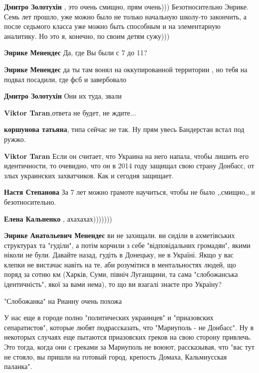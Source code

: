 \begin{itemize}
\begin{itemize}
\textbf{Дмитро Золотухін} , это очень смищно, прям очень))) Безотносительно Энрике. Семь лет прошло, уже можно было не только начальную школу-то закончить, а после седьмого класса уже можно быть способным и на элементарную аналитику. Но это я, конечно, по своим детям сужу)))

\textbf{Энрике Менендес} Да, где Вы были с 7 до 11?

\textbf{Энрике Менендес} да ты там вонял на оккупированной территории , но тебя на подвал посадили, где фсб и завербовало

\textbf{Дмитро Золотухін} Они их туда, звали

\textbf{Viktor Taran},ответа не будет, не ждите...

\textbf{коршунова татьяна}, типа сейчас не так. Ну прям увесь Бандерстан встал под ружжо.

\textbf{Viktor Taran} Если он считает, что Украина на него напала, чтобы лишить его идентичности, то очевидно, что он в 2014 году защищал свою страну Донбасс, от злых украинских захватчиков. Как и сегодня защищает.

\textbf{Настя Степанова} За 7 лет можно грамоте научиться, чтобы не было ,,смищно,, и безотносительно.

\textbf{Елена Кальненко} , ахахахах)))))))

\textbf{Энрике Анатольевич Менендес} ви не захищали. ви сиділи в ахметівських структурах та "гуділи", а потім корчили з себе "відповідальних громадян", якими ніколи не були. Давайте назад, гудіть в Донецьку, не в Україні.
Якщо у вас клепки не вистачає навіть на те, аби розумітися в ментальностях людей, що поряд за сотню км (Харків, Суми, північ Луганщини, та сама "слобожанська ідентичність", якої за вами нема), то що ви взагалі знаєте про Україну?

\end{itemize} %

"Слобожанка" на Рианну очень похожа


У нас еще в городе полно "политических украинцев" и "приазовских сепаратистов",
которые любят подрассказать, что "Мариуполь - не Донбасс". Ну в некоторых
случаях еще пытаются приазовских греков на свою сторону привлечь. Это тогда,
когда они с греками за Мариуполь не воюют, рассказывая, что "вас тут не стояло,
вы пришли на готовый город, крепость Домаха, Кальмиусская паланка".


\end{itemize}
